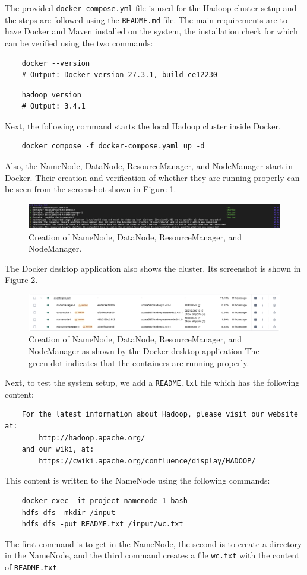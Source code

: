 \documentclass[conference]{IEEEtran}
\begin{document}
The provided \texttt{docker-compose.yml} file is used for the Hadoop cluster setup
and the steps are followed using the \texttt{README.md} file. The main requirements
are to have Docker and Maven installed on the system, the installation check for
which can be verified using the two commands:
\begin{verbatim}
    docker --version
    # Output: Docker version 27.3.1, build ce12230
\end{verbatim}
\begin{verbatim}
    hadoop version
    # Output: 3.4.1
\end{verbatim}
Next, the following command starts the local Hadoop cluster inside Docker.
\begin{verbatim}
    docker compose -f docker-compose.yaml up -d
\end{verbatim}
Also, the NameNode, DataNode, ResourceManager, and NodeManager start in Docker.
Their creation and verification of whether they are running properly can be seen
from the screenshot shown in Figure \ref{fig:nodes_verification}.
\begin{figure}[htbp]
    \centerline{\includegraphics[width=1\textwidth]{graphics/nodes_verification.png}}
    \caption{Creation of NameNode, DataNode, ResourceManager, and NodeManager.}
    \label{fig:nodes_verification}
\end{figure}
The Docker desktop application also shows the cluster. Its screenshot is shown
in Figure \ref{fig:docker_desktop}.
\begin{figure}[htbp]
    \centerline{\includegraphics[width=1\textwidth]{graphics/docker_desktop.png}}
    \caption{Creation of NameNode, DataNode, ResourceManager, and NodeManager as
    shown by the Docker desktop application The green dot indicates that the
    containers are running properly.}
    \label{fig:docker_desktop}
\end{figure}

Next, to test the system setup, we add a \texttt{README.txt} file which has the
following content:
\begin{verbatim}
    For the latest information about Hadoop, please visit our website at:
        http://hadoop.apache.org/
    and our wiki, at:
        https://cwiki.apache.org/confluence/display/HADOOP/
\end{verbatim}
This content is written to the NameNode using the following commands:
\begin{verbatim}
    docker exec -it project-namenode-1 bash
    hdfs dfs -mkdir /input
    hdfs dfs -put README.txt /input/wc.txt
\end{verbatim}
The first command is to get in the NameNode, the second is to create a directory
in the NameNode, and the third command creates a file \texttt{wc.txt} with the
content of \texttt{README.txt}.
\end{document}
